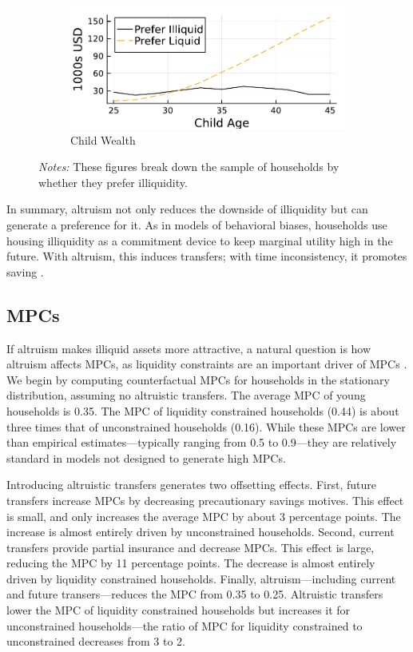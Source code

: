 \documentclass[12pt]{article}
\begin{document}
\begin{figure}[tb]
\begin{subfigure}{0.5\textwidth}
	\end{subfigure}%
	\hfill
	\begin{subfigure}{0.5\textwidth}%
		\caption{Child Wealth}\label{fig:pref_wealthk}%
		\includegraphics[width=\textwidth]{../tabfig/preferliq/prefer_wealthk.pdf}%
	\end{subfigure}%
	\caption*{\footnotesize \textit{Notes:} These figures break down the sample of households by whether they prefer illiquidity.}
\end{figure}

In summary, altruism not only reduces the downside of illiquidity but can generate a preference for it. As in models of behavioral biases, households use housing illiquidity as a commitment device to keep marginal utility high in the future. With altruism, this induces transfers; with time inconsistency, it promotes saving \citep{attanasio2024temptation}. 

\subsection{MPCs}
If altruism makes illiquid assets more attractive, a natural question is how altruism affects MPCs, as liquidity constraints are an important driver of MPCs \citep[see e.g.,][]{aguiar2024hand,Kaplan2014,fagereng2021mpc}. We begin by computing counterfactual MPCs for households in the stationary distribution, assuming no altruistic transfers. The average MPC of young households is 0.35. The MPC of liquidity constrained households (0.44) is about three times that of unconstrained households (0.16). While these MPCs are lower than empirical estimates---typically ranging from 0.5 to 0.9---they are relatively standard in models not designed to generate high MPCs. 

Introducing altruistic transfers generates two offsetting effects. First, future transfers increase MPCs by decreasing precautionary savings motives. This effect is small, and only increases the average MPC by about 3 percentage points. The increase is almost entirely driven by unconstrained households. Second, current transfers provide partial insurance and decrease MPCs. This effect is large, reducing the MPC by 11 percentage points. The decrease is almost entirely driven by liquidity constrained households. Finally, altruism---including current and future transers---reduces the MPC from 0.35 to 0.25. Altruistic transfers lower the MPC of liquidity constrained households but increases it for unconstrained households---the ratio of MPC for liquidity constrained to unconstrained decreases from 3 to 2.
\end{document}
